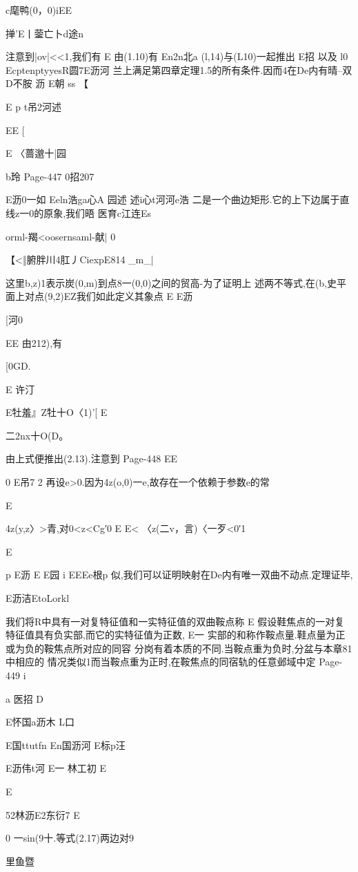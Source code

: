 {{{{{{{c麾鸭(0，0)iEE

掸'E丨蓥亡卜d途n

注意到|ov|<<1,我们有
E
由(1.10)有
En2n北a
(l,14)与(L10)一起推出
E招
以及
l0
EcptenptyyesR圆7E沥河
兰上满足第四章定理1.5的所有条件.因而4在De内有晴--双
D不胺
沥
E朝
ss
【

E
p
t吊2河述

EE
[

E
〈蔷邈十|园

b玲
Page-447
0招207

E沥0一如
Eeln浩ga心A
园述
述i心t河河e浩
二是一个曲边矩形.它的上下边属于直线{z一0}的原象,我们晤
医育c江连Es

orml-羯<oosernsaml-献|
0

【<‖腑胖川4肛丿CiexpE814
_m_|

这里b,z)1表示炭(0,m)到点8一(0,0)之间的贸高-为了证明上
述两不等式,在(b,史平面上对点(9,2)EZ我们如此定义其象点
E
E沥

[河0

EE
由212),有

[0GD.

E
许汀

E牡羞』Z牡十O〈1)'[
E

二2nx十O(D。

由上式便推出(2.13).注意到
Page-448
EE

0
E吊7
2
再设e>0.因为4z(o,0)一e,故存在一个依赖于参数e的常

E

4z(y,z〉>青,对0<z<Cg′0
E
E<
〈z(二v，言)〈一歹<0′1

E

p
E沥
E
E园
i
EEEe根p
似,我们可以证明映射在De内有唯一双曲不动点.定理证毕,

E沥洁EtoLorkl

我们将R中具有一对复特征值和一实特征值的双曲鞍点称
E
假设鞋焦点的一对复特征值具有负实部,而它的实特征值为正数,
E一
实部的和称作鞍点量.鞋点量为正或为负的鞍焦点所对应的同容
分岗有着本质的不同.当鞍点重为负时,分盆与本章81中相应的
情况类似1而当鞍点重为正时,在鞍焦点的同宿轨的任意邺域中定
Page-449
i

a
医招
D

E怀国a沥木
L口

E国ttutfn
En国沥河
E标p汪

E沥伟t河
E一
林工初
E

E

52林沥E2东衍7
E

0
一sin(9十.等式(2.17)两边对9

里鱼暨

}}}}}}}
